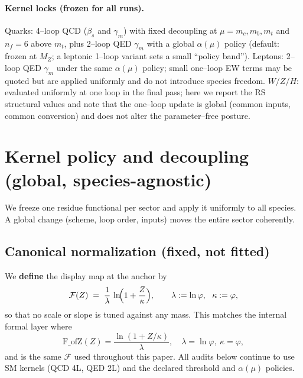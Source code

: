 \documentclass[epjc3]{svjour3}
\begin{document}
\medskip
\paragraph{Kernel locks (frozen for all runs).}
Quarks: 4--loop QCD ($\beta_s$ and $\gamma_m$) with fixed decoupling at $\mu=m_c,m_b,m_t$ and $n_f=6$ above $m_t$, plus 2--loop QED $\gamma_m$ with a global $\alpha(\mu)$ policy (default: frozen at $M_Z$; a leptonic 1--loop variant sets a small ``policy band''). Leptons: 2--loop QED $\gamma_m$ under the same $\alpha(\mu)$ policy; small one--loop EW terms may be quoted but are applied uniformly and do not introduce species freedom. $W/Z/H$: evaluated uniformly at one loop in the final pass; here we report the RS structural values and note that the one--loop update is global (common inputs, common conversion) and does not alter the parameter--free posture.

\section*{Kernel policy and decoupling (global, species-agnostic)}
We freeze one residue functional per sector and apply it uniformly to all species. A global change (scheme, loop order, inputs) moves the entire sector coherently.


\subsection*{Canonical normalization (fixed, not fitted)}
We \textbf{define} the display map at the anchor by
\[
\mathcal F(Z)\;=\;\frac{1}{\lambda}\,\ln\!\Bigl(1+\frac{Z}{\kappa}\Bigr),
\qquad
\lambda:=\ln\varphi,\ \ \kappa:=\varphi,
\]
so that no scale or slope is tuned against any mass. This matches the internal formal layer where
\[
\mathrm{F\_ofZ}(Z)=\frac{\ln(1+Z/\kappa)}{\lambda},\quad
\lambda=\ln\varphi,\ \kappa=\varphi,
\]
and is the same $\mathcal F$ used throughout this paper. All audits below continue to use SM kernels (QCD 4L, QED 2L) and the declared threshold and $\alpha(\mu)$ policies.
\end{document}

